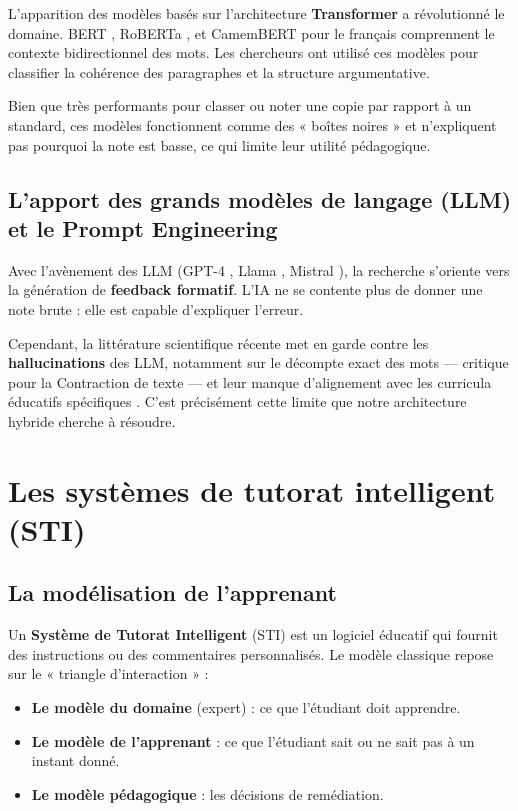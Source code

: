 L'apparition des modèles basés sur l'architecture \textbf{Transformer} \cite{vaswani2017} a révolutionné le domaine. BERT \cite{devlin2019}, RoBERTa \cite{liu2019}, et CamemBERT \cite{martin2020} pour le français comprennent le contexte bidirectionnel des mots. Les chercheurs ont utilisé ces modèles pour classifier la cohérence des paragraphes et la structure argumentative.

Bien que très performants pour classer ou noter une copie par rapport à un standard, ces modèles fonctionnent comme des « boîtes noires » et n'expliquent pas pourquoi la note est basse, ce qui limite leur utilité pédagogique.

\subsection{L'apport des grands modèles de langage (LLM) et le Prompt Engineering}

Avec l'avènement des LLM (GPT-4 \cite{openai2023}, Llama \cite{touvron2023}, Mistral \cite{jiang2024}), la recherche s'oriente vers la génération de \textbf{feedback formatif}. L'IA ne se contente plus de donner une note brute : elle est capable d'expliquer l'erreur.

Cependant, la littérature scientifique récente met en garde contre les \textbf{hallucinations} des LLM, notamment sur le décompte exact des mots — critique pour la Contraction de texte — et leur manque d'alignement avec les curricula éducatifs spécifiques \cite{li2024llm}. C'est précisément cette limite que notre architecture hybride cherche à résoudre.

\section{Les systèmes de tutorat intelligent (STI)}

\subsection{La modélisation de l'apprenant}

Un \textbf{Système de Tutorat Intelligent} (STI) est un logiciel éducatif qui fournit des instructions ou des commentaires personnalisés. Le modèle classique repose sur le « triangle d'interaction » \cite{self1999} :

\begin{itemize}
    \item \textbf{Le modèle du domaine} (expert) : ce que l'étudiant doit apprendre.
    \item \textbf{Le modèle de l'apprenant} : ce que l'étudiant sait ou ne sait pas à un instant donné.
    \item \textbf{Le modèle pédagogique} : les décisions de remédiation.
\end{itemize}

